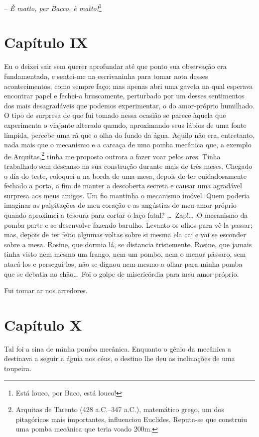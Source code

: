 -- \textit{È matto, per Bacco, è matto!}\footnote{ Está louco, por Baco, está
louco!}

\section*{Capítulo IX}

 Eu o deixei sair sem querer aprofundar até que ponto sua observação era
fundamentada, e sentei-me na escrivaninha para tomar nota desses
acontecimentos, como sempre faço; mas apenas abri uma gaveta na qual
esperava encontrar papel e fechei-a bruscamente, perturbado por um
desses sentimentos dos mais desagradáveis que podemos experimentar, o
do amor-próprio humilhado. O tipo de surpresa de que fui tomado nessa
ocasião se parece àquela que experimenta o viajante alterado quando,
aproximando seus lábios de uma fonte límpida, percebe uma rã que o olha
do fundo da água. Aquilo não era, entretanto, nada mais que o mecanismo
e a carcaça de uma pomba mecânica que, a exemplo de Arquitas,\footnote{
Arquitas de Tarento (428 a.C.--347 a.C.), matemático grego, um dos
pitagóricos mais importantes, influenciou Euclides. Reputa-se que
construiu uma pomba mecânica que teria voado 200m.} tinha me
proposto outrora a fazer voar pelos ares. Tinha trabalhado sem descanso
na sua construção durante mais de três meses. Chegado o dia do teste,
coloquei-a na borda de uma mesa, depois de ter cuidadosamente fechado a
porta, a fim de manter a descoberta secreta e causar uma agradável
surpresa aos meus amigos. Um fio mantinha o mecanismo imóvel. Quem
poderia imaginar as palpitações de meu coração e as angústias de meu
amor-próprio quando aproximei a tesoura para cortar o laço fatal?
\ldots\ Zap!\ldots\ O mecanismo da pomba parte e se desenvolve fazendo barulho.
Levanto os olhos para vê-la passar; mas, depois de ter feito algumas
voltas sobre si mesma ela cai e vai se esconder sobre a mesa. Rosine,
que dormia lá, se distancia tristemente. Rosine, que jamais tinha visto
nem mesmo um frango, nem um pombo, nem o menor pássaro, sem atacá-los e
persegui-los, não se dignou nem mesmo a olhar para minha pomba que se
debatia no chão\ldots\ Foi o golpe de misericórdia para meu amor-próprio.

Fui tomar ar nos arredores.

\section*{Capítulo X}

 Tal foi a sina de minha pomba mecânica. Enquanto o gênio da mecânica a
destinava a seguir a águia nos céus, o destino lhe deu as inclinações
de uma toupeira. 

